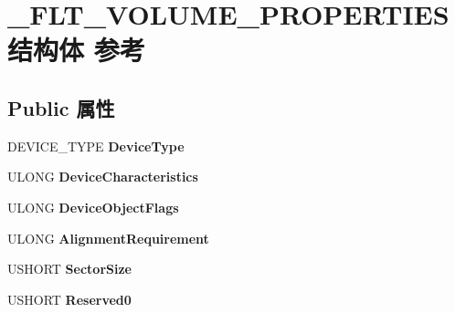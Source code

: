 \hypertarget{struct___f_l_t___v_o_l_u_m_e___p_r_o_p_e_r_t_i_e_s}{}\section{\+\_\+\+F\+L\+T\+\_\+\+V\+O\+L\+U\+M\+E\+\_\+\+P\+R\+O\+P\+E\+R\+T\+I\+E\+S结构体 参考}
\label{struct___f_l_t___v_o_l_u_m_e___p_r_o_p_e_r_t_i_e_s}
\subsection*{Public 属性}
\begin{DoxyCompactItemize}
\item 
\mbox{\label{struct___f_l_t___v_o_l_u_m_e___p_r_o_p_e_r_t_i_e_s_a17849a68ca1d5359773602ce336b919d}} 
D\+E\+V\+I\+C\+E\+\_\+\+T\+Y\+PE {\bfseries Device\+Type}
\item 
\mbox{\label{struct___f_l_t___v_o_l_u_m_e___p_r_o_p_e_r_t_i_e_s_a87c2bf280bdbcb9b3f070ea6515c449d}} 
U\+L\+O\+NG {\bfseries Device\+Characteristics}
\item 
\mbox{\label{struct___f_l_t___v_o_l_u_m_e___p_r_o_p_e_r_t_i_e_s_a26a3408f3adeff98fcd1a1cac099a298}} 
U\+L\+O\+NG {\bfseries Device\+Object\+Flags}
\item 
\mbox{\label{struct___f_l_t___v_o_l_u_m_e___p_r_o_p_e_r_t_i_e_s_adbf06fee250e4ee4c698d08c3f2ceb1c}} 
U\+L\+O\+NG {\bfseries Alignment\+Requirement}
\item 
\mbox{\label{struct___f_l_t___v_o_l_u_m_e___p_r_o_p_e_r_t_i_e_s_a0ad8d40960e58d4ab8bf873c0a92ca21}} 
U\+S\+H\+O\+RT {\bfseries Sector\+Size}
\item 
\mbox{\label{struct___f_l_t___v_o_l_u_m_e___p_r_o_p_e_r_t_i_e_s_ade605b9efd546cff9d208f08352d26f1}} 
U\+S\+H\+O\+RT {\bfseries Reserved0}
\item 
\mbox{\label{struct___f_l_t___v_o_l_u_m_e___p_r_o_p_e_r_t_i_e_s_a849a76bb14b2718f79141f6feb670e1b}} 

\end{DoxyCompactItemize}
